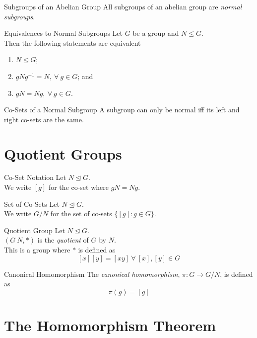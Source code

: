 \documentclass[11pt,a4paper]{article}
\begin{document}
\subtitle{Theorem 15.09 - }{Subgroups of an Abelian Group}
All subgroups of an abelian group are \textit{normal subgroups}.\\

\subtitle{Proposition 15.10 - }{Equivalences to Normal Subgroups}
Let $G$ be a group and $N \leq G$.\\
Then the following statements are equivalent
\begin{enumerate}[label=\roman*)]
  \item $N \trianglelefteq G$;
  \item $gNg^{-1} = N,\ \forall\ g \in G$; and
  \item $gN = Ng,\ \forall\ g \in G$.\\
\end{enumerate}

\subtitle{Remark 15.11 - }{Co-Sets of a Normal Subgroup}
A subgroup can only be normal iff its left and right co-sets are the same.

\section{Quotient Groups}

\subtitle{Definition 16.01 - }{Co-Set Notation}
Let $N \trianglelefteq G$.\\
We write $[g]$ for the co-set where $gN = Ng$.\\

\subtitle{Definition 16.02 - }{Set of Co-Sets}
Let $N \trianglelefteq G$.\\
We write $G / N$ for the set of co-sets $\{[g] : g \in G\}$.\\

\subtitle{Theorem 16.03 - }{Quotient Group}
Let $N \trianglelefteq G$.\\
$(G\ N, *)$ is the \textit{quotient} of $G$ by $N$.\\
This is a group where $*$ is defined as
$$[x][y] = [xy]\ \forall\ [x], [y] \in G$$

\subtitle{Proposition 16.04 - }{Canonical Homomorphism}
The \textit{canonical homomorphism}, $\pi : G \to G / N$, is defined as
$$\pi(g) = [g]$$

\section{The Homomorphism Theorem}
\end{document}

